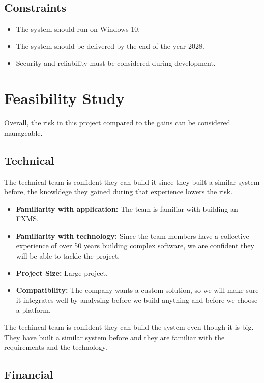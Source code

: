 \documentclass[a4paper]{report}
\begin{document}
\section{Constraints}
\begin{itemize}
    \item The system should run on Windows 10.
    \item The system should be delivered by the end of the year 2028.
    \item Security and reliability must be considered during development.
\end{itemize}

\chapter{Feasibility Study}
 
Overall, the risk in this project compared to the gains can be considered manageable.

\section{Technical}

The technical team is confident they can build it since they built a similar system before, the knowldege they gained during that experience lowers the risk.

\begin{itemize}
    \item \textbf{Familiarity with application:} The team is familiar with building an FXMS.
    \item \textbf{Familiarity with technology:} Since the team members have a collective experience of over 50 years building complex software, we are confident they will be able to tackle the project.
    \item \textbf{Project Size:} Large project.
    \item \textbf{Compatibility:} The company wants a custom solution, so we will make sure it integrates well by analysing before we build anything and before we choose a platform.
\end{itemize}

The techincal team is confident they can build the system even though it is big. They have built a similar system before and they are familiar with the requirements and the technology.

\newpage

\section{Financial}
\end{document}
